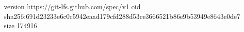 version https://git-lfs.github.com/spec/v1
oid sha256:691d23233e6c0c5942eaad179cfd288d53ce3666521b86e9b53949e8643e0de7
size 174916
